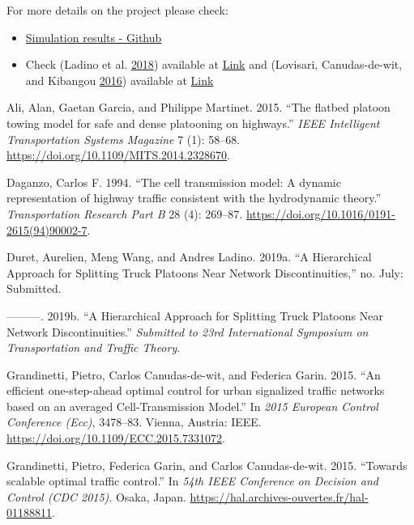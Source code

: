 \documentclass[]{book}
\theoremstyle{definition}
\theoremstyle{definition}
\theoremstyle{definition}
\theoremstyle{remark}
\begin{document}
For more details on the project please check:

\begin{itemize}
\item
  \href{https://github.com/aladinoster/density-reconstruction}{Simulation
  results - Github}
\item
  Check (Ladino et al. \protect\hyperlink{ref-Ladino2018}{2018})
  available at
  \href{https://hal.archives-ouvertes.fr/hal-01731356}{Link} and
  (Lovisari, Canudas-de-wit, and Kibangou
  \protect\hyperlink{ref-Lovisari2016}{2016}) available at
  \href{https://hal.archives-ouvertes.fr/hal-01375928}{Link}
\end{itemize}

\hypertarget{refs}{}
\leavevmode\hypertarget{ref-Ali2015:ITSM}{}%
Ali, Alan, Gaetan Garcia, and Philippe Martinet. 2015. ``The flatbed
platoon towing model for safe and dense platooning on highways.''
\emph{IEEE Intelligent Transportation Systems Magazine} 7 (1): 58--68.
\url{https://doi.org/10.1109/MITS.2014.2328670}.

\leavevmode\hypertarget{ref-Daganzo1994:TR-B}{}%
Daganzo, Carlos F. 1994. ``The cell transmission model: A dynamic
representation of highway traffic consistent with the hydrodynamic
theory.'' \emph{Transportation Research Part B} 28 (4): 269--87.
\url{https://doi.org/10.1016/0191-2615(94)90002-7}.

\leavevmode\hypertarget{ref-Duret2019:ISTTT}{}%
Duret, Aurelien, Meng Wang, and Andres Ladino. 2019a. ``A Hierarchical
Approach for Splitting Truck Platoons Near Network Discontinuities,''
no. July: Submitted.

\leavevmode\hypertarget{ref-Duret2019}{}%
---------. 2019b. ``A Hierarchical Approach for Splitting Truck Platoons
Near Network Discontinuities.'' \emph{Submitted to 23rd International
Symposium on Transportation and Traffic Theory}.

\leavevmode\hypertarget{ref-Grandinetti2015}{}%
Grandinetti, Pietro, Carlos Canudas-de-wit, and Federica Garin. 2015.
``An efficient one-step-ahead optimal control for urban signalized
traffic networks based on an averaged Cell-Transmission Model.'' In
\emph{2015 European Control Conference (Ecc)}, 3478--83. Vienna,
Austria: IEEE. \url{https://doi.org/10.1109/ECC.2015.7331072}.

\leavevmode\hypertarget{ref-Grandinetti2016}{}%
Grandinetti, Pietro, Federica Garin, and Carlos Canudas-de-wit. 2015.
``Towards scalable optimal traffic control.'' In \emph{54th IEEE
Conference on Decision and Control (CDC 2015)}. Osaka, Japan.
\url{https://hal.archives-ouvertes.fr/hal-01188811}.
\end{document}
